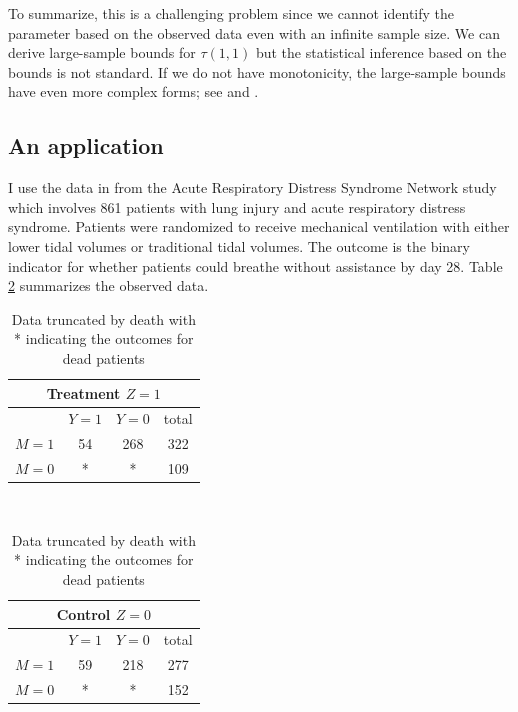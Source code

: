 To summarize, this is a challenging problem since we cannot identify the parameter based on the observed data even with an infinite sample size. We can derive large-sample bounds for $\tau(1,1)$ but the statistical inference based on the bounds is not standard. If we do not have monotonicity, the large-sample bounds have even more complex forms; see \citet{zhang2003estimation} and \citet[][Appendix A]{jiang2016principal}. 




\subsection{An application}\label{section::ps-application}


I use the data in \citet{yang2016using} from the Acute Respiratory Distress Syndrome Network study which involves 861 patients with lung injury and acute respiratory distress syndrome. Patients were randomized to receive mechanical ventilation with either lower tidal volumes or traditional tidal volumes. The outcome is the binary indicator for whether patients could breathe without assistance by day 28. Table \ref{tb::truncationbydeath} summarizes the observed data. 


\begin{table} 
\centering 
\caption{Data truncated by death with * indicating the outcomes for dead patients}\label{tb::truncationbydeath}
\begin{tabular}{cccc}
\hline 
\multicolumn{4}{c}{ Treatment $Z=1$} \\
\hline 
 & $Y=1$ & $Y=0$ &  total\\
$M=1$ &    54 & 268& 322 \\
$M=0$  & * & * & 109 \\
\hline 
\end{tabular}
~~~~~
\begin{tabular}{cccc}
\hline 
\multicolumn{4}{c}{ Control $Z=0$} \\
\hline 
 & $Y=1$ & $Y=0$ &total \\
$M=1$ &    59 & 218&  277 \\
$M=0$  & * & *& 152 \\
\hline 
\end{tabular}
\end{table}


